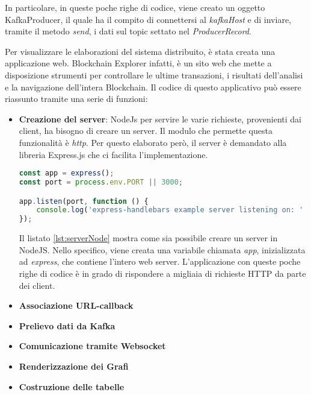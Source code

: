 \begin{itemize}
\begin{itemize}
In particolare, in queste poche righe di codice, viene creato un oggetto KafkaProducer, il quale ha il compito di connettersi al \textit{kafkaHost} e di inviare, tramite il metodo \textit{send}, i dati sul topic settato nel \textit{ProducerRecord}. 

\end{itemize}
\end{itemize} 

Per visualizzare le elaborazioni del sistema distribuito, è stata creata una applicazione web. Blockchain Explorer infatti, è un sito web che mette a disposizione strumenti per controllare le ultime transazioni, i risultati dell'analisi e la navigazione dell'intera Blockchain. Il codice di questo applicativo può essere riassunto tramite una serie di funzioni:

\begin{itemize}
\item \textbf{Creazione del server}: NodeJs per servire le varie richieste, provenienti dai client, ha bisogno di creare un server. Il modulo che permette questa funzionalità è \textit{http}. Per questo elaborato però, il server è demandato alla libreria Express.js che ci facilita l'implementazione.

\begin{lstlisting}[language=Javascript, label=lst:serverNode, caption={Creazione server in NodeJS.}]
const app = express();
const port = process.env.PORT || 3000;

app.listen(port, function () {
    console.log('express-handlebars example server listening on: ' + port);
});
\end{lstlisting}
Il listato \ref{lst:serverNode} mostra come sia possibile creare un server in NodeJS. Nello specifico, viene creata una variabile chiamata \textit{app}, inizializzata ad \textit{express}, che contiene l'intero web server. L'applicazione con queste poche righe di codice è in grado di rispondere a migliaia di richieste HTTP da parte dei client.
\item \textbf{Associazione URL-callback}
\item \textbf{Prelievo dati da Kafka}
\item \textbf{Comunicazione tramite Websocket}
\item \textbf{Renderizzazione dei Grafi}
\item \textbf{Costruzione delle tabelle}
\end{itemize}